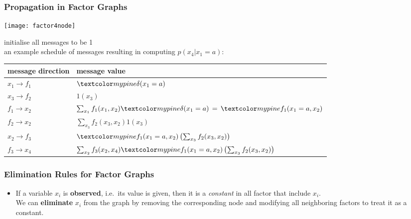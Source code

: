 \begin{frame}
\frametitle{Propagation in Factor Graphs}

\centerline{\texttt{[image: factor4node]}}

initialise all messages to be 1\\

an example schedule of messages resulting in computing $p(x_4 | x_1 = a)$:\\

\begin{tabular}{ll}
\hline message direction & message value \\ \hline
$x_1 \rightarrow f_1$ & $\Green{\delta(x_1 = a)}$ \\
$x_3 \rightarrow f_2$ & $1(x_3)$ \\
$f_1 \rightarrow x_2$ & $\sum_{x_1} f_1(x_1,x_2) \Green{\delta(x_1 =
  a)} \,  = \,
\Green{f_1(x_1 = a ,x_2)} $ \\
$f_2 \rightarrow x_2$ & $\sum_{x_3} f_2(x_3,x_2) 1(x_3)$ \\
$x_2 \rightarrow f_3$ & $ \Green{f_1(x_1=a,x_2)} 
\left(\sum_{x_3} f_2(x_3,x_2) \right)$ \\ 
$f_3 \rightarrow x_4$ & $\sum_{x_2} f_3(x_2,x_4) 
\Green{f_1(x_1 = a,x_2)} \left(\sum_{x_3} f_2(x_3,x_2) \right)$ \\ \hline
\end{tabular}

\end{frame}
\begin{frame}
\frametitle{Elimination Rules for Factor Graphs}

\begin{itemize}
\item {}

If a variable $x_i$ is {\bf observed}, i.e.\ its value is given, then
it is a {\em constant} in all factor that include $x_i$.\\

We can {\bf eliminate} $x_i$ from the graph by removing the
corresponding node and modifying all neighboring factors to treat it
as a constant.
\end{itemize}

\end{frame}
